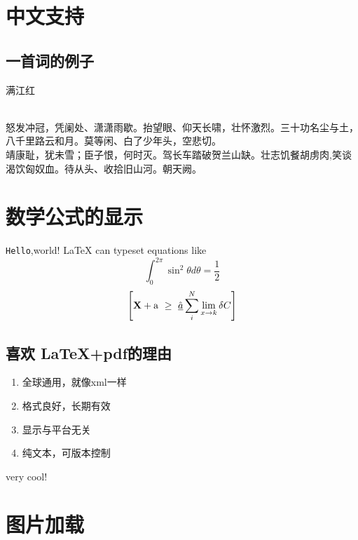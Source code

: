\documentclass[a4paper,12pt]{article}				%
\title{\LaTeX边学边用边总结}								%
\author{CSiP}								%
\date{\today}									%
\begin{document}
\begin{CJK*}{UTF8}{gbsn}
	\maketitle								%
	\section{中文支持}
	\subsection{一首词的例子}
	\begin{center}
	\Large{满江红}\\
	\\
\end{center}
怒发冲冠，凭阑处、潇潇雨歇。抬望眼、仰天长啸，壮怀激烈。三十功名尘与土，八千里路云和月。莫等闲、白了少年头，空悲切。 \\							%
	靖康耻，犹未雪；臣子恨，何时灭。驾长车踏破贺兰山缺。壮志饥餐胡虏肉,笑谈渴饮匈奴血。待从头、收拾旧山河。朝天阙。
	\section{数学公式的显示}
	\texttt{Hello},\textrm{world}! {\LaTeX}				%
	can typeset equations like
	\begin{equation}					%
		\int^{2\pi}_0\sin^2\theta d\theta = \frac{1}{2}
	\end{equation}						%
	\begin{equation}					%
		\left[
		{\bf X} + {\rm a} \ \geq\
		\underline{\hat a} \sum_i^N \lim_{x \rightarrow k} \delta C
		\right]
	\end{equation}						%
	\subsection{喜欢 \LaTeX +pdf的理由}
	\begin{enumerate}
		\item 全球通用，就像xml一样
		\item 格式良好，长期有效
		\item 显示与平台无关
		\item 纯文本，可版本控制
	\end{enumerate}
	very cool!
\section{图片加载}
\end{CJK*}
\end{document}

